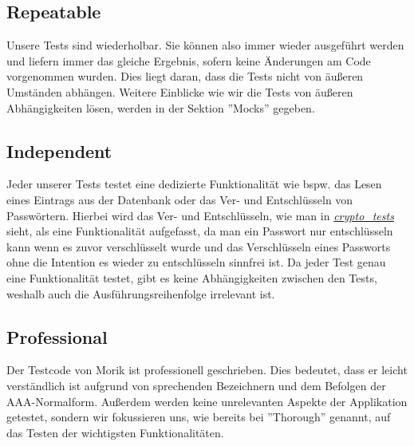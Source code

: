 \subsection{Repeatable}
Unsere Tests sind wiederholbar. Sie können also immer wieder ausgeführt werden und liefern immer das gleiche Ergebnis, sofern keine Änderungen am Code vorgenommen wurden. Dies liegt daran, dass die Tests nicht von äußeren Umständen abhängen. Weitere Einblicke wie wir die Tests von äußeren Abhängigkeiten lösen, werden in der Sektion ''Mocks'' gegeben.

\subsection{Independent}
Jeder unserer Tests testet eine dedizierte Funktionalität wie bspw. das Lesen eines Eintrags aus der Datenbank oder das Ver- und Entschlüsseln von Passwörtern. Hierbei wird das Ver- und Entschlüsseln, wie man in \href{https://github.com/moorts/Morik/blob/main/src/tests/plugins/encryption/crypto_tests.cpp}{\textit{crypto\_tests}} sieht, als eine Funktionalität aufgefasst, da man ein Passwort nur entschlüsseln kann wenn es zuvor verschlüsselt wurde und das Verschlüsseln eines Passworts ohne die Intention es wieder zu entschlüsseln sinnfrei ist. Da jeder Test genau eine Funktionalität testet, gibt es keine Abhängigkeiten zwischen den Tests, weshalb auch die Ausführungsreihenfolge irrelevant ist.

\subsection{Professional}
Der Testcode von Morik ist professionell geschrieben. Dies bedeutet, dass er leicht verständlich ist aufgrund von sprechenden Bezeichnern und dem Befolgen der AAA-Normalform. Außerdem werden keine unrelevanten Aspekte der Applikation getestet, sondern wir fokussieren uns, wie bereits bei ''Thorough'' genannt, auf das Testen der wichtigsten Funktionalitäten.


